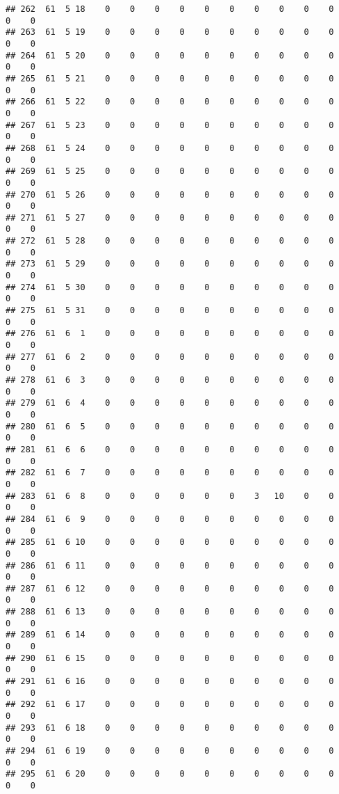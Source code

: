 \documentclass[]{article}
\begin{document}
\begin{verbatim}
## 262  61  5 18    0    0    0    0    0    0    0    0    0    0    0    0
## 263  61  5 19    0    0    0    0    0    0    0    0    0    0    0    0
## 264  61  5 20    0    0    0    0    0    0    0    0    0    0    0    0
## 265  61  5 21    0    0    0    0    0    0    0    0    0    0    0    0
## 266  61  5 22    0    0    0    0    0    0    0    0    0    0    0    0
## 267  61  5 23    0    0    0    0    0    0    0    0    0    0    0    0
## 268  61  5 24    0    0    0    0    0    0    0    0    0    0    0    0
## 269  61  5 25    0    0    0    0    0    0    0    0    0    0    0    0
## 270  61  5 26    0    0    0    0    0    0    0    0    0    0    0    0
## 271  61  5 27    0    0    0    0    0    0    0    0    0    0    0    0
## 272  61  5 28    0    0    0    0    0    0    0    0    0    0    0    0
## 273  61  5 29    0    0    0    0    0    0    0    0    0    0    0    0
## 274  61  5 30    0    0    0    0    0    0    0    0    0    0    0    0
## 275  61  5 31    0    0    0    0    0    0    0    0    0    0    0    0
## 276  61  6  1    0    0    0    0    0    0    0    0    0    0    0    0
## 277  61  6  2    0    0    0    0    0    0    0    0    0    0    0    0
## 278  61  6  3    0    0    0    0    0    0    0    0    0    0    0    0
## 279  61  6  4    0    0    0    0    0    0    0    0    0    0    0    0
## 280  61  6  5    0    0    0    0    0    0    0    0    0    0    0    0
## 281  61  6  6    0    0    0    0    0    0    0    0    0    0    0    0
## 282  61  6  7    0    0    0    0    0    0    0    0    0    0    0    0
## 283  61  6  8    0    0    0    0    0    0    3   10    0    0    0    0
## 284  61  6  9    0    0    0    0    0    0    0    0    0    0    0    0
## 285  61  6 10    0    0    0    0    0    0    0    0    0    0    0    0
## 286  61  6 11    0    0    0    0    0    0    0    0    0    0    0    0
## 287  61  6 12    0    0    0    0    0    0    0    0    0    0    0    0
## 288  61  6 13    0    0    0    0    0    0    0    0    0    0    0    0
## 289  61  6 14    0    0    0    0    0    0    0    0    0    0    0    0
## 290  61  6 15    0    0    0    0    0    0    0    0    0    0    0    0
## 291  61  6 16    0    0    0    0    0    0    0    0    0    0    0    0
## 292  61  6 17    0    0    0    0    0    0    0    0    0    0    0    0
## 293  61  6 18    0    0    0    0    0    0    0    0    0    0    0    0
## 294  61  6 19    0    0    0    0    0    0    0    0    0    0    0    0
## 295  61  6 20    0    0    0    0    0    0    0    0    0    0    0    0

\end{verbatim}
\end{document}

